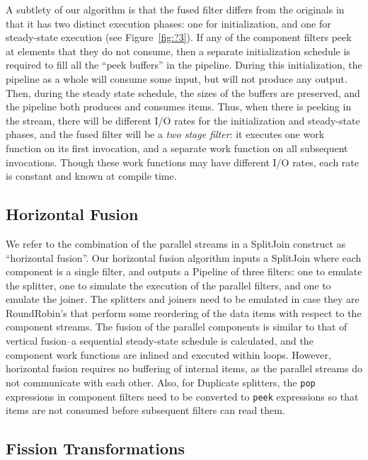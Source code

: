 A subtlety of our algorithm is that the fused filter differs from the
originals in that it has two distinct execution phases: one for
initialization, and one for steady-state execution (see
Figure~\ref{fig:?3}).  If any of the component filters peek at
elements that they do not consume, then a separate initialization
schedule is required to fill all the ``peek buffers'' in the pipeline.
During this initialization, the pipeline as a whole will consume some
input, but will not produce any output.  Then, during the steady state
schedule, the sizes of the buffers are preserved, and the pipeline
both produces and consumes items.  Thus, when there is peeking in the
stream, there will be different I/O rates for the initialization and
steady-state phases, and the fused filter will be a {\it two stage
filter}: it executes one work function on its first invocation, and a
separate work function on all subsequent invocations.  Though these
work functions may have different I/O rates, each rate is constant and
known at compile time.

\subsection{Horizontal Fusion}

We refer to the combination of the parallel streams in a SplitJoin
construct as ``horizontal fusion''.  Our horizontal fusion algorithm
inputs a SplitJoin where each component is a single filter, and
outputs a Pipeline of three filters: one to emulate the splitter, one
to simulate the execution of the parallel filters, and one to emulate
the joiner.  The splitters and joiners need to be emulated in case
they are RoundRobin's that perform some reordering of the data items
with respect to the component streams.  The fusion of the parallel
components is similar to that of vertical fusion--a sequential
steady-state schedule is calculated, and the component work functions
are inlined and executed within loops.  However, horizontal fusion
requires no buffering of internal items, as the parallel streams do
not communicate with each other.  Also, for Duplicate splitters, the
{\tt pop} expressions in component filters need to be converted to
{\tt peek} expressions so that items are not consumed before
subsequent filters can read them.

\subsection{Fission Transformations}

